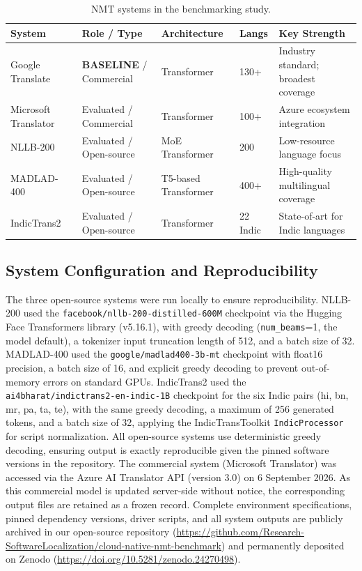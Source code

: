 \documentclass[pdflatex,sn-mathphys-num]{sn-jnl}
\begin{document}
\begin{table}[h]
\centering
\caption{NMT systems in the benchmarking study.}\label{tab:systems}
\footnotesize
\begin{tabularx}{\textwidth}{@{}llllX@{}}
\toprule
System & Role / Type & Architecture & Langs & Key Strength \\
\midrule
Google Translate & \textbf{BASELINE} / Commercial & Transformer & 130+ & Industry standard; broadest coverage \\
Microsoft Translator & Evaluated / Commercial & Transformer & 100+ & Azure ecosystem integration \\
NLLB-200 & Evaluated / Open-source & MoE Transformer & 200 & Low-resource language focus \\
MADLAD-400 & Evaluated / Open-source & T5-based Transformer & 400+ & High-quality multilingual coverage \\
IndicTrans2~\cite{30} & Evaluated / Open-source & Transformer & 22 Indic & State-of-art for Indic languages \\
\bottomrule
\end{tabularx}
\end{table}

\subsection{System Configuration and Reproducibility}

The three open-source systems were run locally to ensure reproducibility. NLLB-200 used the \texttt{facebook/nllb-200-distilled-600M} checkpoint via the Hugging Face Transformers library (v5.16.1), with greedy decoding (\texttt{num\_beams}=1, the model default), a tokenizer input truncation length of 512, and a batch size of 32. MADLAD-400 used the \texttt{google/madlad400-3b-mt} checkpoint with float16 precision, a batch size of 16, and explicit greedy decoding to prevent out-of-memory errors on standard GPUs. IndicTrans2 used the \texttt{ai4bharat/indictrans2-en-indic-1B} checkpoint for the six Indic pairs (hi, bn, mr, pa, ta, te), with the same greedy decoding, a maximum of 256 generated tokens, and a batch size of 32, applying the IndicTransToolkit \texttt{IndicProcessor} for script normalization. All open-source systems use deterministic greedy decoding, ensuring output is exactly reproducible given the pinned software versions in the repository. The commercial system (Microsoft Translator) was accessed via the Azure AI Translator API (version 3.0) on 6 September 2026. As this commercial model is updated server-side without notice, the corresponding output files are retained as a frozen record. Complete environment specifications, pinned dependency versions, driver scripts, and all system outputs are publicly archived in our open-source repository (\url{https://github.com/Research-SoftwareLocalization/cloud-native-nmt-benchmark}) and permanently deposited on Zenodo (\url{https://doi.org/10.5281/zenodo.24270498}).
\end{document}
